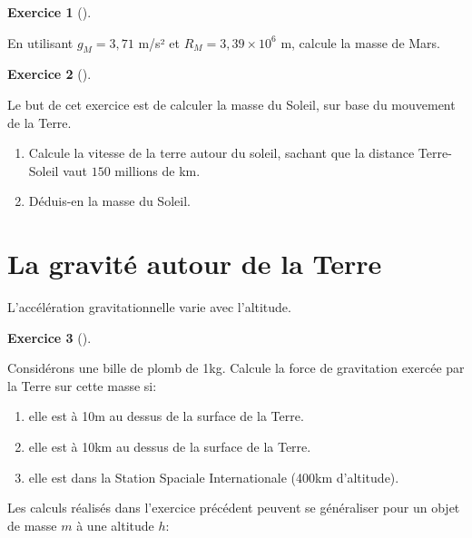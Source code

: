 \documentclass[
  letterpaper,
  DIV=11,
  numbers=noendperiod]{scrartcl}
\providecommand{\tightlist}{%
  \setlength{\itemsep}{0pt}\setlength{\parskip}{0pt}}\usepackage{longtable,booktabs,array}
\theoremstyle{definition}
\theoremstyle{definition}
\theoremstyle{definition}
\newtheorem{exercise}{Exercice}[section]
\theoremstyle{remark}
\begin{document}
\begin{exercise}[]\protect\hypertarget{exr-masse-terre}{}\label{exr-masse-terre}

En utilisant \(g_M = 3,71\) m/s² et \(R_M = 3,39 \times 10^6\) m,
calcule la masse de Mars.

\end{exercise}

\begin{exercise}[]\protect\hypertarget{exr-masse-mars}{}\label{exr-masse-mars}

Le but de cet exercice est de calculer la masse du Soleil, sur base du
mouvement de la Terre.

\begin{enumerate}
\def\labelenumi{\arabic{enumi}.}
\tightlist
\item
  Calcule la vitesse de la terre autour du soleil, sachant que la
  distance Terre-Soleil vaut \(150\) millions de km.
\item
  Déduis-en la masse du Soleil.
\end{enumerate}

\end{exercise}

\section{La gravité autour de la
Terre}\label{la-gravituxe9-autour-de-la-terre}

L'accélération gravitationnelle varie avec l'altitude.

\begin{exercise}[]\protect\hypertarget{exr-alt}{}\label{exr-alt}

Considérons une bille de plomb de 1kg. Calcule la force de gravitation
exercée par la Terre sur cette masse si:

\begin{enumerate}
\def\labelenumi{\arabic{enumi}.}
\tightlist
\item
  elle est à 10m au dessus de la surface de la Terre.
\item
  elle est à 10km au dessus de la surface de la Terre.
\item
  elle est dans la Station Spaciale Internationale (400km d'altitude).
\end{enumerate}

\end{exercise}

Les calculs réalisés dans l'exercice précédent peuvent se généraliser
pour un objet de masse \(m\) à une altitude \(h\):
\end{document}
